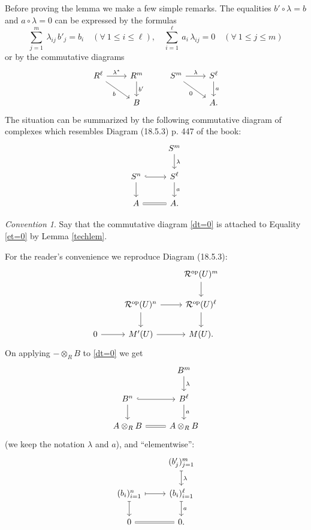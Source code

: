 \documentclass[12pt]{article}
\theoremstyle{remark}
\newtheorem{conv}[thm]{Convention}
\theoremstyle{definition}
\newcommand{\cc}{\mathcal}
\DeclareMathOperator{\op}{op}
\begin{document}
Before proving the lemma we make a few simple remarks. The equalities $b'\circ\lambda=b$ and $a\circ\lambda=0$ can be expressed by the formulas
$$
\sum_{j=1}^m\ \lambda_{ij}\,b'_j=b_i\quad(\forall\ 1\le i\le\ell),\quad
\sum_{i=1}^\ell\ a_i\,\lambda_{ij}=0\quad(\forall\ 1\le j\le m)
$$
or by the commutative diagrams
$$
\begin{tikzcd}
R^\ell\ar{r}{\lambda^*}\ar{rd}[swap]{b}&R^m\ar{d}{b'}&
S^m\ar{r}{\lambda}\ar{rd}[swap]{0}&S^\ell\ar{d}{a}
\\ 
{}&B&{}&A.
\end{tikzcd}
$$ 
The situation can be summarized by the following commutative diagram of complexes which resembles Diagram (18.5.3) p. 447 of the book:
%
\begin{equation}\label{dt=0}
\begin{tikzcd}
{}&S^m\ar{d}{\lambda}\\ 
S^n\ar[hook]{r}\ar{d}&S^\ell\ar{d}{a}\\ 
A\ar[equal]{r}&A.
\end{tikzcd}
\end{equation}
%
\begin{conv}\label{ct=0}
Say that the commutative diagram \eqref{dt=0} is attached to Equality \eqref{et=0} by Lemma \ref{techlem}.
\end{conv}
%
For the reader's convenience we reproduce Diagram (18.5.3): 
$$
\begin{tikzcd}
{}&{}&\cc R^{\op}(U)^m\ar{d}\\ 
{}&\cc R^{\op}(U)^n\ar{d}\ar{r}&\cc R^{\op}(U)^\ell\ar{d}\\ 
0\ar{r}&M'(U)\ar{r}&M(U).
\end{tikzcd}
$$
On applying $-\otimes_RB$ to \eqref{dt=0} we get 
%
\begin{equation*}
\begin{tikzcd}
{}&B^m\ar{d}{\lambda}\\ 
B^n\ar[hook]{r}\ar{d}&B^\ell\ar{d}{a}\\ 
A\otimes_RB\ar[equal]{r}&A\otimes_RB
\end{tikzcd}
\end{equation*}
%
(we keep the notation $\lambda$ and $a$), and ``elementwise'':
%
\begin{equation}\label{eltwise}
\begin{tikzcd}
{}&(b'_j)_{j=1}^m\ar[mapsto]{d}{\lambda}\\ 
(b_i)_{i=1}^n\ar[mapsto]{r}\ar[mapsto]{d}&(b_i)_{i=1}^\ell\ar[mapsto]{d}{a}\\ 
0\ar[equal]{r}&0.
\end{tikzcd}
\end{equation}
\end{document}
